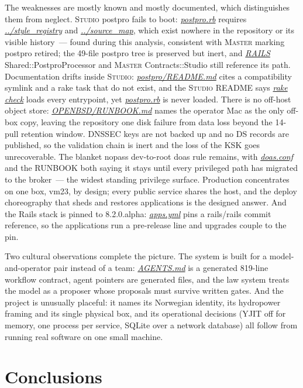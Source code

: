 \documentclass[oneside]{article}
\newcommand{\treename}[1]{\mbox{\textsc{#1}}}
\newcommand{\mtree}{\treename{Master}}
\newcommand{\stree}{\treename{Studio}}
\newcommand{\fpath}[1]{\emph{\url{#1}}}
\begin{document}
The weaknesses are mostly known and mostly documented, which distinguishes them from neglect. \stree{} postpro fails to boot: \fpath{postpro.rb} requires \fpath{../style_registry} and \fpath{../source_map}, which exist nowhere in the repository or its visible history~--- found during this analysis, consistent with \mtree{} marking postpro retired; the 49-file postpro tree is preserved but inert, and \fpath{RAILS} Shared::PostproProcessor and \mtree{} Contracts::Studio still reference its path. Documentation drifts inside \stree: \fpath{postpro/README.md} cites a compatibility symlink and a rake task that do not exist, and the \stree{} README says \fpath{rake check} loads every entrypoint, yet \fpath{postpro.rb} is never loaded. There is no off-host object store: \fpath{OPENBSD/RUNBOOK.md} names the operator Mac as the only off-box copy, leaving the repository one disk failure from data loss beyond the 14-pull retention window. DNSSEC keys are not backed up and no DS records are published, so the validation chain is inert and the loss of the KSK goes unrecoverable. The blanket nopass dev-to-root doas rule remains, with \fpath{doas.conf} and the RUNBOOK both saying it stays until every privileged path has migrated to the broker~--- the widest standing privilege surface. Production concentrates on one box, vm23, by design; every public service shares the host, and the deploy choreography that sheds and restores applications is the designed answer. And the Rails stack is pinned to 8.2.0.alpha: \fpath{apps.yml} pins a rails/rails commit reference, so the applications run a pre-release line and upgrades couple to the pin.

Two cultural observations complete the picture. The system is built for a model-and-operator pair instead of a team: \fpath{AGENTS.md} is a generated 819-line workflow contract, agent pointers are generated files, and the law system treats the model as a proposer whose proposals must survive written gates. And the project is unusually placeful: it names its Norwegian identity, its hydropower framing and its single physical box, and its operational decisions (YJIT off for memory, one process per service, SQLite over a network database) all follow from running real software on one small machine.

\section{Conclusions}
\end{document}
